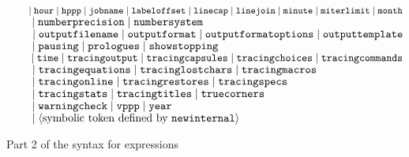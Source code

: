 \begin{figure}[htp]
\begin{ctabbing}
$\tt \qquad \;|\; hour \;|\; hppp \;|\; jobname \;|\; labeloffset \;|\; linecap \;|\; linejoin
\;|\; minute \;|\; miterlimit \;|\; month$\\
$\tt \qquad \;|\; numberprecision \;|\; numbersystem$\\
$\tt \qquad \;|\; outputfilename \;|\; outputformat \;|\; outputformatoptions \;|\; outputtemplate$\\
$\tt \qquad \;|\; pausing \;|\; prologues \;|\; showstopping$\\
$\tt \qquad \;|\; time \;|\; tracingoutput \;|\; tracingcapsules \;|\; tracingchoices \;|\; tracingcommands$\\
$\tt \qquad \;|\; tracingequations \;|\; tracinglostchars \;|\; tracingmacros$\\
$\tt \qquad \;|\; tracingonline \;|\; tracingrestores \;|\; tracingspecs$\\
$\tt \qquad \;|\; tracingstats \;|\; tracingtitles \;|\; truecorners$\\
$\tt \qquad \;|\; warningcheck \;|\; vppp \;|\; year$\\
$\tt \qquad \;|\; {\langle\hbox{symbolic token defined by {\tt newinternal}}\rangle}$
\end{ctabbing}
\caption{Part 2 of the syntax for expressions}
%
%
%
\label{syexpr2}
\end{figure}

